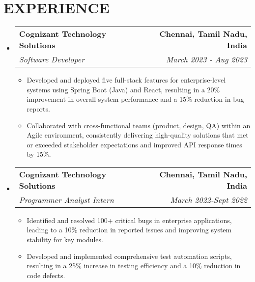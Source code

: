 \documentclass[letterpaper,11pt]{article}
\makeatletter
\newcommand{\resumeItem}[1]{\item\small{{#1 \vspace{-2pt}}}}
\newcommand{\resumeSubheading}[4]{\vspace{-2pt}\item\begin{tabular*}{0.97\textwidth}[t]{l@{\extracolsep{\fill}}r}\textbf{#1} & #2 \\\textit{\small#3} & \textit{\small #4} \\\end{tabular*}\vspace{-7pt}}
\newcommand{\resumeSubHeadingListStart}{\begin{itemize}[leftmargin=0.15in, label={}]}
\newcommand{\resumeSubHeadingListEnd}{\end{itemize}}
\newcommand{\resumeItemListStart}{\begin{itemize}}
\newcommand{\resumeItemListEnd}{\end{itemize}\vspace{-5pt}}
\makeatother
\begin{document}
\section{{\fontsize{9pt}{20pt}\selectfont \textbf{EXPERIENCE}}}
\resumeSubHeadingListStart
\resumeSubheading{Cognizant Technology Solutions}{\textbf{Chennai, Tamil Nadu, India}}{Software Developer}{March 2023 - Aug 2023}
\resumeItemListStart
\resumeItem{Developed and deployed five full-stack features for enterprise-level systems using Spring Boot (Java) and React, resulting in a 20\% improvement in overall system performance and a 15\% reduction in bug reports.}
\resumeItem{Collaborated with cross-functional teams (product, design, QA) within an Agile environment, consistently delivering high-quality solutions that met or exceeded stakeholder expectations and improved API response times by 15\%.}
\resumeItemListEnd
\resumeSubheading{Cognizant Technology Solutions}{\textbf{Chennai, Tamil Nadu, India}}{Programmer Analyst Intern}{March 2022-Sept 2022}
\resumeItemListStart
\resumeItem{Identified and resolved 100+ critical bugs in enterprise applications, leading to a 10\% reduction in reported issues and improving system stability for key modules.}
\resumeItem{Developed and implemented comprehensive test automation scripts, resulting in a 25\% increase in testing efficiency and a 10\% reduction in code defects.}
\resumeItemListEnd
\resumeSubHeadingListEnd
\vspace{-17pt}
\end{document}
